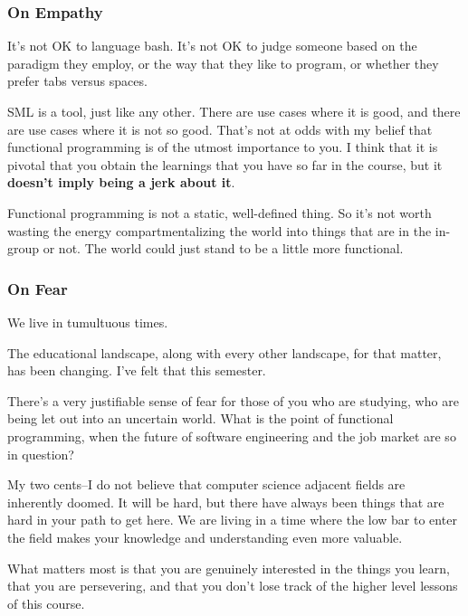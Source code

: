 \documentclass[aspectratio=169, handout]{beamer}
\begin{document}
\begin{frame}[fragile]
  \frametitle{On Empathy}

  It's not OK to language bash. It's not OK to judge someone based on the
  paradigm they employ, or the way that they like to program, or whether
  they prefer tabs versus spaces.

  \pause
  \vspace{\fill}

  SML is a tool, just like any other. There are use cases where it is good,
  and there are use cases where it is not so good. That's not at odds with
  my belief that functional programming is of the utmost importance to you.
  I think that it is pivotal that you obtain the learnings that you have so
  far in the course, but it \textbf{doesn't imply being a jerk about it}.

  \pause
  \vspace{\fill}

  Functional programming is not a static, well-defined thing. So
  it's not worth wasting the energy compartmentalizing the world into things
  that are in the in-group or not. The world could just stand to be a little
  more functional.
\end{frame}

\begin{frame}[fragile]
  \frametitle{On Fear}

  We live in tumultuous times.

  \pause
  \vspace{\fill}

  The educational landscape, along with every other landscape, for that matter,
  has been changing. I've felt that this semester.

  \pause
  \vspace{\fill}

  There's a very justifiable sense of fear for those of you who are
  studying, who are being let out into an uncertain world. What is the
  point of functional programming, when the future of software engineering
  and the job market are so in question?

  \pause
  \vspace{\fill}

  My two cents--I do not believe that computer science adjacent fields are
  inherently doomed. It will be hard, but there have always been things
  that are hard in your path to get here. We are living in a time where
  the low bar to enter the field makes your knowledge and understanding
  even more valuable.

  \pause
  \vspace{\fill}

  What matters most is that you are genuinely interested in the things
  you learn, that you are persevering, and that you don't lose track
  of the higher level lessons of this course.
\end{frame}
\end{document}
